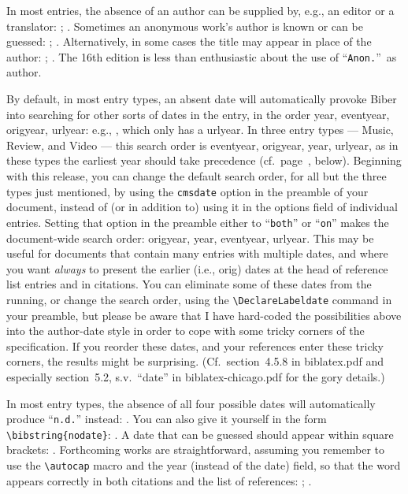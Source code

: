 \documentclass[a4paper,12pt]{report}
\newcommand{\cmd}[1]{\texttt{\textbackslash #1}}
\begin{document}
In most entries, the absence of an author can be supplied by, e.g., an
editor or a translator: \autocite{chaucer:alt};
\autocite{silver:gawain}.  Sometimes an anonymous work's author is
known or can be guessed: \autocite{horsley:prosodies};
\autocite{cook:sotweed}.  Alternatively, in some cases the
\textsf{title} may appear in place of the \textsf{author}:
\autocite{anon:stanze}; \autocite{virginia:plantation}.  The 16th
edition is less than enthusiastic about the use of
\enquote{\texttt{Anon.}}\ as author.

By default, in most entry types, an absent \textsf{date} will
automatically provoke \textsf{Biber} into searching for other sorts of
dates in the entry, in the order \textsf{year, eventyear, origyear,
  urlyear}: e.g., \autocite{evanston:library}, which only has a
\textsf{urlyear}.  In three entry types --- \textsf{Music},
\textsf{Review}, and \textsf{Video} --- this search order is
\textsf{eventyear, origyear, year, urlyear}, as in these types the
earliest year should take precedence (cf.\
page~\pageref{sec:audiovisual}, below).  Beginning with this release,
you can change the default search order, for all but the three types
just mentioned, by using the \texttt{cmsdate} option in the preamble
of your document, instead of (or in addition to) using it in the
\textsf{options} field of individual entries.  Setting that option in
the preamble either to \enquote{\texttt{both}} or
\enquote{\texttt{on}} makes the document-wide search order:
\textsf{origyear, year, eventyear, urlyear}.  This may be useful for
documents that contain many entries with multiple dates, and where you
want \emph{always} to present the earlier (i.e., \textsf{orig}) dates
at the head of reference list entries and in citations.  You can
eliminate some of these dates from the running, or change the search
order, using the \cmd{DeclareLabeldate} command in your preamble, but
please be aware that I have hard-coded the possibilities above into
the author-date style in order to cope with some tricky corners of the
specification.  If you reorder these dates, and your references enter
these tricky corners, the results might be surprising.  (Cf.\
section~4.5.8 in \textsf{biblatex.pdf} and especially section~5.2,
s.v.\ \enquote{\textsf{date}} in \textsf{biblatex-chicago.pdf} for the
gory details.)

In most entry types, the absence of all four possible dates will
automatically produce \mbox{\enquote{\texttt{n.d.}\hspace{-2pt}}}
instead: \autocite{bernstein:shostakovich}.  You can also give it
yourself in the form \cmd{bibstring\{nodate\}}:
\autocite{ross:thesis}.  A date that can be guessed should appear
within square brackets: \autocite{clark:mesopot}.  Forthcoming works
are straightforward, assuming you remember to use the \cmd{autocap}
macro and the \textsf{year} (instead of the \textsf{date}) field, so
that the word appears correctly in both citations and the list of
references: \autocite{author:forthcoming}; \autocite{contrib:contrib}.
\end{document}
